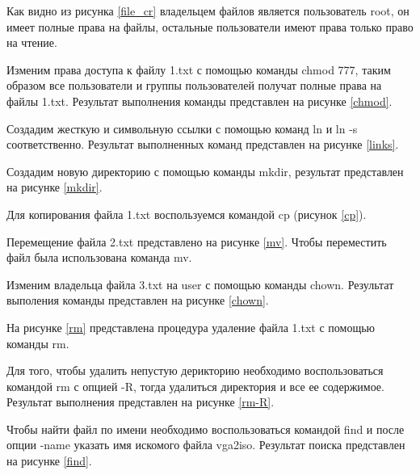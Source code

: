 Как видно из рисунка \ref{file_cr} владельцем файлов является пользователь root, он имеет полные права на файлы, остальные пользователи имеют права только право на чтение.

Изменим права доступа к файлу 1.txt с помощью команды chmod 777, таким образом все пользователи и группы пользователей получат полные права на файлы 1.txt. Результат выполнения команды представлен на рисунке \ref{chmod}.

\newpage
Создадим жесткую и символьную ссылки с помощью команд ln и ln -s соответственно. Результат выполненных команд представлен на рисунке \ref{links}.

Создадим новую директорию с помощью команды mkdir, результат представлен на рисунке \ref{mkdir}.

Для копирования файла 1.txt воспользуемся командой cp (рисунок \ref{cp}). 

\newpage 
Перемещение файла 2.txt представлено на рисунке \ref{mv}. Чтобы переместить файл была использована команда mv.

Изменим владельца файла 3.txt на user с помощью команды chown. Результат выполения команды представлен на рисунке \ref{chown}.

На рисунке \ref{rm} представлена процедура удаление файла 1.txt с помощью команды rm.

Для того, чтобы удалить непустую дерикторию необходимо воспользоваться командой rm с опцией -R, тогда удалиться директория и все ее содержимое. Результат выполнения представлен на рисунке \ref{rm-R}.

Чтобы найти файл по имени необходимо воспользоваться командой find и после опции -name указать имя искомого файла vga2iso. Результат поиска представлен на рисунке \ref{find}.
